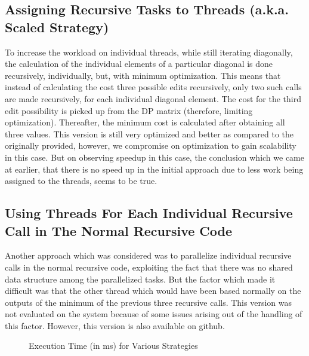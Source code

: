 \documentclass[a4paper,10pt,twoside]{article}
\begin{document}
\subsection{Assigning Recursive Tasks to Threads (a.k.a. Scaled Strategy)}
To increase the workload on individual threads, while still iterating diagonally, the calculation of the individual elements of a particular diagonal is done recursively, individually, but, with minimum optimization. This means that instead of calculating the cost three possible edits recursively, only two such calls are made recursively, for each individual diagonal element. The cost for the third edit possibility is picked up from the DP matrix (therefore, limiting optimization). Thereafter, the minimum cost is calculated after obtaining all three values. This version is still very optimized and better as compared to the originally provided, however, we compromise on optimization to gain scalability in this case. But on observing speedup in this case, the conclusion which we came at earlier, that there is no speed up in the initial approach due to less work being assigned to the threads, seems to be true. 

\subsection{Using Threads For Each Individual Recursive Call in The Normal Recursive Code}
Another approach which was considered was to parallelize individual recursive calls in the normal recursive code, exploiting the fact that there was no shared data structure among the parallelized tasks. But the factor which made it difficult was that the other thread which would have been based normally on the outputs of the minimum of the previous three recursive calls. This version was not evaluated on the system because of some issues arising out of the handling of this factor. However, this version is also available on github.


\begin{figure}[t]
	\centering
	\caption{Execution Time (in ms) for Various Strategies}
	\label{fig:ualloc}
\end{figure}
\end{document}
